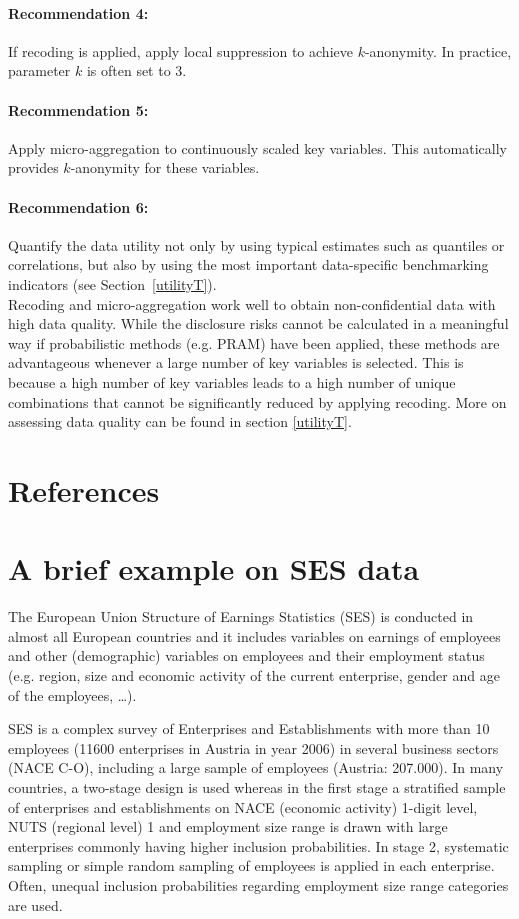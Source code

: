 \documentclass[12pt]{scrartcl}\usepackage[]{graphicx}\usepackage[]{color}
\begin{document}
\paragraph{Recommendation 4:} If recoding is applied, apply local suppression to achieve $k$-anonymity. In practice, parameter $k$ is often set to $3$.
\paragraph{Recommendation 5:} Apply micro-aggregation to continuously scaled key variables. This automatically provides $k$-anonymity for these variables.
\paragraph{Recommendation 6:} Quantify the data utility not only by using typical estimates such as quantiles or correlations, but also by using the most important data-specific benchmarking indicators (see Section~\ref{utilityT}).\\

Recoding and micro-aggregation work well to obtain non-confidential data with high data quality. While the disclosure risks cannot be calculated in a meaningful way if probabilistic methods (e.g. PRAM) have been applied, these methods are advantageous whenever a large number of key variables is selected. This is because a high number of key variables leads to a high number of unique combinations that cannot be significantly reduced by applying recoding. More on assessing data quality can be found in section \ref{utilityT}.

\section*{References}




\appendix
\section{A brief example on SES data}


The European Union Structure of Earnings Statistics (SES) is conducted in almost all European countries and it includes variables on earnings of employees and other (demographic) variables on employees and their employment status (e.g. region, size and economic activity of the current  enterprise, gender and age of the employees, \ldots).

SES is a complex survey of Enterprises and Establishments with more than 10 employees (11600 enterprises in Austria in year 2006) in several business sectors (NACE C-O), including a large sample of employees (Austria: 207.000). In many countries, a two-stage design is used whereas in the first stage a stratified sample of enterprises and establishments on NACE (economic activity) 1-digit level, NUTS (regional level) 1 and employment size range is drawn with large enterprises commonly having higher inclusion probabilities. In stage 2, systematic sampling or simple random sampling of employees is applied in each enterprise. Often, unequal inclusion probabilities regarding employment size range categories are used.
\end{document}
